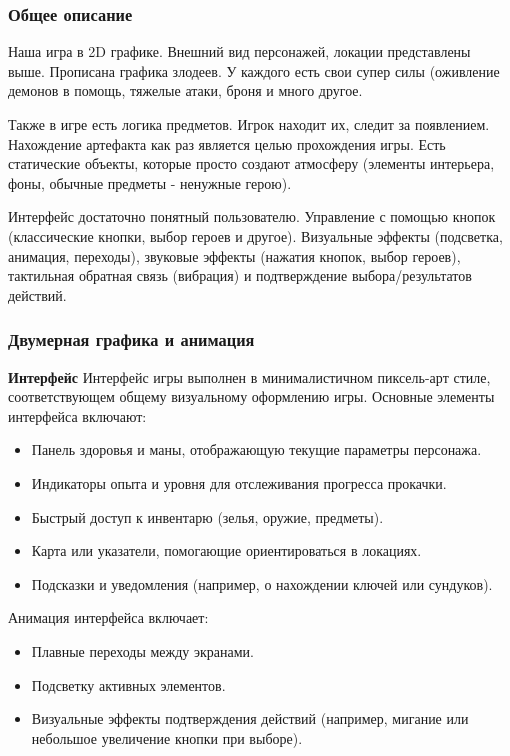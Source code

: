 \documentclass{article}
\begin{document}
\subsubsection{Общее описание}
Наша игра в 2D графике. Внешний вид персонажей, локации представлены выше. Прописана графика злодеев. У каждого есть свои супер силы (оживление демонов в помощь, тяжелые атаки, броня и много другое. 
\par Также в игре есть логика предметов. Игрок находит их, следит за появлением. Нахождение артефакта как раз является целью прохождения игры. Есть статические объекты, которые просто создают атмосферу (элементы интерьера, фоны, обычные предметы - ненужные герою).
\par Интерфейс достаточно понятный пользователю. Управление с помощью кнопок (классические кнопки, выбор героев и другое). Визуальные эффекты (подсветка, анимация, переходы), звуковые эффекты (нажатия кнопок, выбор героев), тактильная обратная связь (вибрация) и подтверждение выбора/результатов действий.


\subsubsection{Двумерная графика и анимация}

\textbf{Интерфейс}
Интерфейс игры выполнен в минималистичном пиксель-арт стиле, соответствующем общему визуальному оформлению игры. Основные элементы интерфейса включают:
\begin{itemize}
    \item Панель здоровья и маны, отображающую текущие параметры персонажа.
    \item Индикаторы опыта и уровня для отслеживания прогресса прокачки.
    \item Быстрый доступ к инвентарю (зелья, оружие, предметы).
    \item Карта или указатели, помогающие ориентироваться в локациях.
    \item Подсказки и уведомления (например, о нахождении ключей или сундуков).
\end{itemize}

Анимация интерфейса включает:
\begin{itemize}
    \item Плавные переходы между экранами.
    \item Подсветку активных элементов.
    \item Визуальные эффекты подтверждения действий (например, мигание или небольшое увеличение кнопки при выборе).
\end{itemize}
\end{document}
